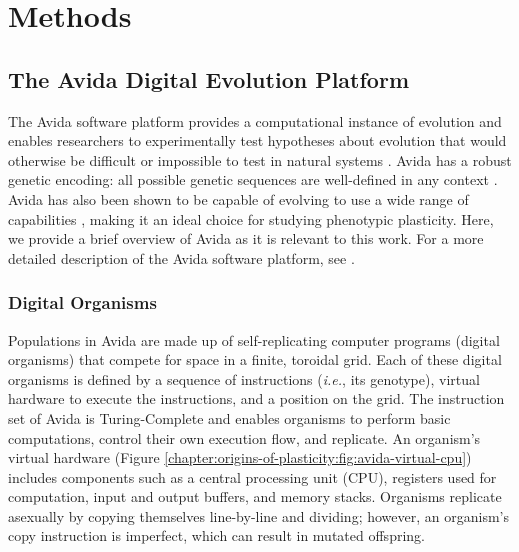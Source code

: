 \section{Methods}
\label{chapter:origins-of-plasticity:sec:methods}

\subsection{The Avida Digital Evolution Platform}
\label{chapter:origins-of-plasticity:sec:methods:avida}

The Avida software platform provides a computational instance of evolution and enables researchers to experimentally test hypotheses about evolution that would otherwise be difficult or impossible to test in natural systems \citep{ofria_avida:_2009}. 
Avida has a robust genetic encoding: all possible genetic sequences are well-defined in any context \citep{ofria_avida:_2009}. 
Avida has also been shown to be capable of evolving to use a wide range of capabilities \citep{bryson_understanding_2013}, making it an ideal choice for studying phenotypic plasticity. 
Here, we provide a brief overview of Avida as it is relevant to this work. 
For a more detailed description of the Avida software platform, see \citep{ofria_avida:_2009}.

\subsubsection{Digital Organisms}
\label{chapter:origins-of-plasticity:sec:methods:avida:organisms}

Populations in Avida are made up of self-replicating computer programs (digital organisms) that compete for space in a finite, toroidal grid. 
Each of these digital organisms is defined by a sequence of instructions (\textit{i.e.}, its genotype), virtual hardware to execute the instructions, and a position on the grid. 
The instruction set of Avida is Turing-Complete and enables organisms to perform basic computations, control their own execution flow, and replicate. 
An organism's virtual hardware (Figure \ref{chapter:origins-of-plasticity:fig:avida-virtual-cpu}) includes components such as a central processing unit (CPU), registers used for computation, input and output buffers, and memory stacks. 
Organisms replicate asexually by copying themselves line-by-line and dividing; however, an organism's copy instruction is imperfect, which can result in mutated offspring.



